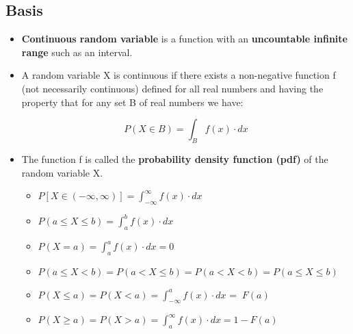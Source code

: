 \documentclass[12pt]{report}
\renewcommand{\_}{\kern-1.5pt\textunderscore\kern-1.5pt}
\begin{document}
\subsection*{Basis}
\begin{itemize}
	\item \textbf{Continuous random variable} is a function with an \textbf{uncountable infinite range} such as an interval. \par

	\item A random variable X is continuous if there exists a non-negative function f (not necessarily continuous) defined for all real numbers and having the property that for any set B of real numbers we have:\par

 \[ P \left( X \in B \right) = \int _{B}^{}f \left( x \right)  \cdot dx \] \par

	\item The function f is called the \textbf{probability density function (pdf)} of the random variable X.\par

\begin{itemize}
	\item  \( P \left[ X \in  \left( -\infty,\infty \right)  \right] = \int _{-\infty}^{\infty}f \left( x \right)  \cdot dx \) \par

	\item  \( P \left( a \leq X \leq b \right) = \int _{a}^{b}f \left( x \right)  \cdot dx \) \par

	\item  \( P \left( X=a \right) = \int _{a}^{a}f \left( x \right)  \cdot dx=0 \) \par

	\item  \( P \left( a \leq X<b \right) =P \left( a<X \leq b \right) =P \left( a<X<b \right) =P \left( a \leq X \leq b \right)  \) \par

	\item  \( P \left( X \leq a \right) =P \left( X<a \right) = \int _{-\infty}^{a}f \left( x \right)  \cdot dx \) = \( ~F \left( a \right)  \)  \par

	\item  \( P \left( X \geq a \right) =P \left( X>a \right) = \int _{a}^{\infty}f \left( x \right)  \cdot dx=1-F \left( a \right)  \) \par


\end{itemize}
\end{itemize}
\end{document}
